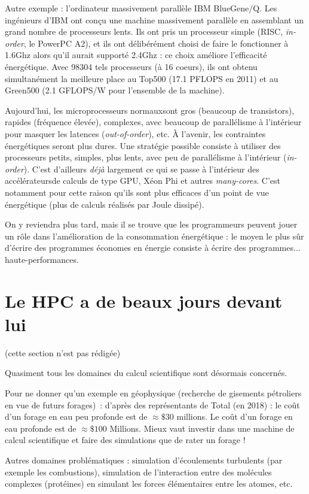 Autre exemple : l'ordinateur massivement parallèle IBM BlueGene/Q. Les
ingénieurs d'IBM ont conçu une machine massivement parallèle en assemblant un
grand nombre de processeurs \og lents\fg. Ils ont pris un processeur simple
(RISC, \emph{in-order}, le PowerPC A2), et ils ont délibérément choisi de faire
le fonctionner à 1.6Ghz alors qu'il aurait supporté 2.4Ghz : ce choix améliore
l'efficacité énergétique. Avec 98304 tels processeurs (à 16 coeurs), ils ont
obtenu simultanément la meilleure place au Top500 (17.1 PFLOPS en 2011) et au
Green500 (2.1 GFLOPS/W pour l'ensemble de la machine).

Aujourd'hui, les microprocesseurs \og normaux\fg sont gros (beaucoup de
transistors), rapides (fréquence élevée), complexes, avec beaucoup de
parallélisme à l'intérieur pour masquer les latences (\emph{out-of-order}),
etc. À l'avenir, les contraintes énergétiques seront plus dures. Une stratégie
possible consiste à utiliser des processeurs petits, simples, plus lents, avec
peu de parallélisme à l'intérieur (\emph{in-order}). C'est d'ailleurs
\emph{déjà} largement ce qui se passe à l'intérieur des \og accélérateurs\fg de
calculs de type GPU, Xéon Phi et autres \emph{many-cores}. C'est notamment pour
cette raison qu'ils sont plus efficaces d'un point de vue énergétique (plus de
calculs réalisés par Joule dissipé).

On y reviendra plus tard, mais il se trouve que les programmeurs peuvent jouer
un rôle dans l'amélioration de la consommation énergétique : le moyen le plus
sûr d'écrire des programmes économes en énergie consiste à écrire des
programmes...  \og haute-performances\fg.

\section{Le HPC a de beaux jours devant lui}

(cette section n'est pas rédigée)

Quasiment tous les domaines du calcul scientifique sont désormais concernés.

Pour ne donner qu'un exemple en géophysique (recherche de gisements pétroliers
en vue de futurs forages)~: d'après des représentants de Total (en 2018) : le
coût d'un forage en eau peu profonde est de $\approx \$30$ millions. Le coût
d'un forage en eau profonde est de $\approx \$100$ Millions. Mieux vaut investir
dans une machine de calcul scientifique et faire des simulations que de rater un
forage !

Autres domaines problématiques : simulation d'écoulements turbulents (par
exemple les combustions), simulation de l'interaction entre des molécules
complexes (protéines) en simulant les forces élémentaires entre les atomes, etc.

